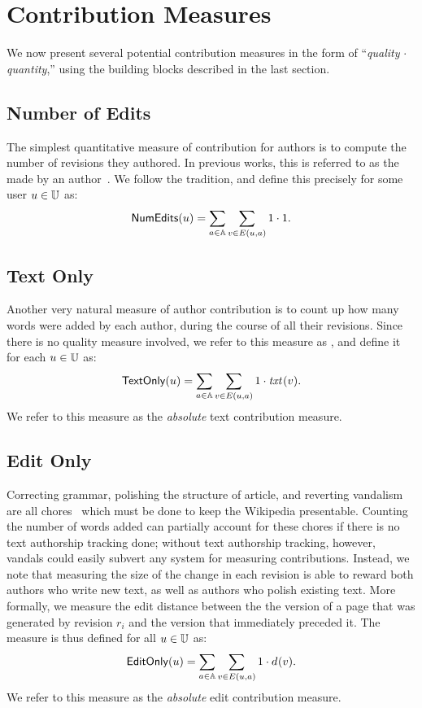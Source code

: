 \section{Contribution Measures}

We now present several potential contribution measures in the form of
``\textit{quality} $\cdot$ \textit{quantity},''
using the building blocks described in the last section.

\subsection{Number of Edits}

\noindent
The simplest quantitative measure of contribution for
authors is to compute the number of revisions they authored.
In previous works, this is referred to as the
 made by an
author~\cite{Wales2005,Wilkinson2007,Kittur2007,SteinHess2007}.
We follow the tradition, and define this precisely
for some user $u \in \mathbb{U}$ as:
%
\[
\numedits(u) = \sum_{a \in \articles} \sum_{v \in E(u, a)} 1 \cdot 1.
\]
%

\subsection{Text Only}

\noindent
Another very natural measure of author contribution
is to count up how many words were added by each author,
during the course of all their revisions.
Since there is no quality measure involved,
we refer to this measure as \textonly,
and define it for each $u \in \mathbb{U}$ as:
%
\[
\textonly(u) = \sum_{a \in \articles} \sum_{v \in E(u, a)} 1 \cdot \txt{}{v}.
\]
%
We refer to this measure as the {\em absolute\/} text contribution
measure.

\subsection{Edit Only}

\noindent
Correcting grammar, polishing the structure of article,
and reverting vandalism are all chores~\cite{Burke2008}
which must be done to keep the Wikipedia presentable.
Counting the number of words added can partially account
for these chores if there is no text authorship tracking done;
without text authorship tracking, however, vandals could
easily subvert any system for measuring contributions.
Instead, we note that measuring the size of the change
in each revision is able to reward both authors who write
new text, as well as authors who polish existing text.
More formally, we measure the edit distance between the
the version of a page that was generated by revision $r_i$
and the version that immediately preceded it.
The \editonly measure is thus defined for all $u \in \mathbb{U}$ as:
%
\[
\editonly(u) = \sum_{a \in \articles} \sum_{v \in E(u, a)} 1 \cdot \dist{}{v}.
\]
%
We refer to this measure as the {\em absolute\/} edit contribution
measure.

